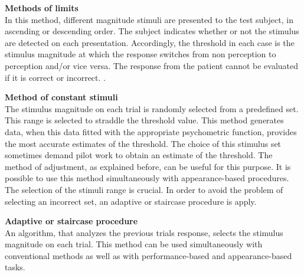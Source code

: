 \textbf{Methods of limits} 
\\
In this method, different magnitude stimuli are presented to the test subject, in ascending or descending order. The subject indicates whether or not the stimulus are detected on each presentation. Accordingly, the threshold in each case is the stimulus magnitude at which the response switches from non perception to perception and/or vice versa. The response from the patient cannot be evaluated if it is correct or incorrect. \cite{Kingdom2016}. 


\textbf{Method of constant stimuli}
\\
The stimulus magnitude on each trial is randomly selected from a predefined set. This range is selected to straddle the threshold value. This method generates data, when this data fitted with the appropriate psychometric function, provides the most accurate estimates of the threshold. The choice of this stimulus set sometimes demand pilot work to obtain an estimate of the threshold. The method of adjustment, as explained before, can be useful for this purpose. It is possible to use this method simultaneously with appearance-based procedures. The selection of the stimuli range is crucial. In order to avoid the problem of selecting an incorrect set, an adaptive or staircase procedure is apply.

\textbf{Adaptive or staircase procedure}
\\
An algorithm, that analyzes the previous trials response, selects the stimulus magnitude on each trial. This method can be used simultaneously  with conventional methods as well as with performance-based and appearance-based tasks.

